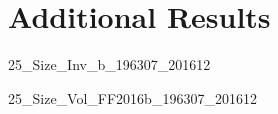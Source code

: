 
\section{Additional Results} \label{sec:addl_results}

{25_Size_Inv_b_196307_201612}





{25_Size_Vol_FF2016b_196307_201612}
